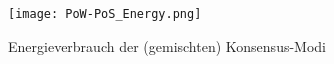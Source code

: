 \begin{figure}[!h]
    \begin{center}
        \texttt{[image: PoW-PoS\_Energy.png]}
    \end{center}
    \caption{Energieverbrauch der (gemischten) Konsensus-Modi}
    \label{fig:PoWPoS_Energy}
\end{figure}







